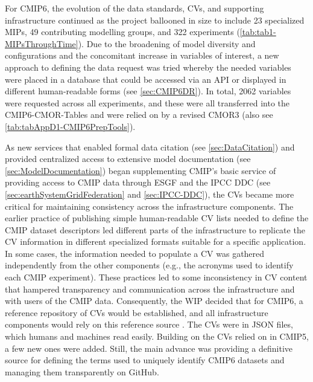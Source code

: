 \documentclass[gmd, preprint]{copernicus}
\begin{document}
For CMIP6, the evolution of the data standards, CVs, and supporting infrastructure continued as the project ballooned in size to include 23 specialized MIPs, 49 contributing modelling groups, and 322 experiments (\autoref{tab:tab1-MIPsThroughTime}). Due to the broadening of model diversity and configurations and the concomitant increase in variables of interest, a new approach to defining the data request was tried whereby the needed variables were placed in a database that could be accessed via an API or displayed in different human-readable forms (see \autoref{sec:CMIP6DR}). In total, 2062 variables were requested across all experiments, and these were all transferred into the CMIP6-CMOR-Tables \citep{nadeau_cmip6_2017} and were relied on by a revised CMOR3 \citep{mauzey_cmor_2024} (also see \autoref{tab:tabAppD1-CMIP6PrepTools}).

As new services that enabled formal data citation (see \autoref{sec:DataCitation}) and provided centralized access to extensive model documentation (see \autoref{sec:ModelDocumentation}) began supplementing CMIP's basic service of providing access to CMIP data through ESGF and the IPCC DDC (see \autoref{sec:earthSystemGridFederation} and \autoref{sec:IPCC-DDC}), the CVs became more critical for maintaining consistency across the infrastructure components. The earlier practice of publishing simple human-readable CV lists needed to define the CMIP dataset descriptors led different parts of the infrastructure to replicate the CV information in different specialized formats suitable for a specific application. In some cases, the information needed to populate a CV was gathered independently from the other components (e.g., the acronyms used to identify each CMIP experiment). These practices led to some inconsistency in CV content that hampered transparency and communication across the infrastructure and with users of the CMIP data. Consequently, the WIP decided that for CMIP6, a reference repository of CVs would be established, and all infrastructure components would rely on this reference source \citep{durack_cmip6_2024}. The CVs were in JSON files, which humans and machines read easily. Building on the CVs relied on in CMIP5, a few new ones were added. Still, the main advance was providing a definitive source for defining the terms used to uniquely identify CMIP6 datasets and managing them transparently on GitHub.
\end{document}
